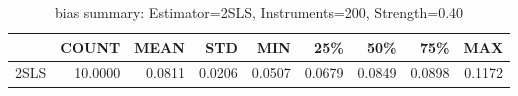 \begin{table}[ht]
\centering
\caption{bias summary: Estimator=2SLS, Instruments=200, Strength=0.40}
\begin{tabular}{lrrrrrrrr}
\toprule
 & COUNT & MEAN & STD & MIN & 25\% & 50\% & 75\% & MAX \\
\midrule
2SLS & 10.0000 & 0.0811 & 0.0206 & 0.0507 & 0.0679 & 0.0849 & 0.0898 & 0.1172 \\
\bottomrule
\end{tabular}
\end{table}
